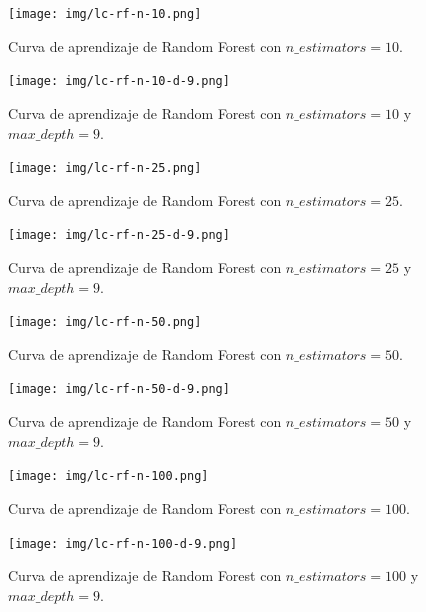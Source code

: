 \documentclass[11pt,a4paper]{article}
\begin{document}
\begin{figure}[H]
\centering
\begin{minipage}{.5\textwidth}
    \centering
    \texttt{[image: img/lc-rf-n-10.png]}
    \caption{Curva de aprendizaje de Random Forest con $n\_estimators=10$.}
    \label{fig:lc-rf-n-10}
\end{minipage}%
\begin{minipage}{.5\textwidth}
    \centering
    \texttt{[image: img/lc-rf-n-10-d-9.png]}
    \caption{Curva de aprendizaje de Random Forest con $n\_estimators=10$ y $max\_depth=9$.}
    \label{fig:lc-rf-n-10-d-9}
\end{minipage}
\end{figure}

\begin{figure}[H]
\centering
\begin{minipage}{.5\textwidth}
    \centering
    \texttt{[image: img/lc-rf-n-25.png]}
    \caption{Curva de aprendizaje de Random Forest con $n\_estimators=25$.}
    \label{fig:lc-rf-n-25}
\end{minipage}%
\begin{minipage}{.5\textwidth}
    \centering
    \texttt{[image: img/lc-rf-n-25-d-9.png]}
    \caption{Curva de aprendizaje de Random Forest con $n\_estimators=25$ y $max\_depth=9$.}
    \label{fig:lc-rf-n-25-d-9}
\end{minipage}
\end{figure}

\begin{figure}[H]
\centering
\begin{minipage}{.5\textwidth}
    \centering
    \texttt{[image: img/lc-rf-n-50.png]}
    \caption{Curva de aprendizaje de Random Forest con $n\_estimators=50$.}
    \label{fig:lc-rf-n-50}
\end{minipage}%
\begin{minipage}{.5\textwidth}
    \centering
    \texttt{[image: img/lc-rf-n-50-d-9.png]}
    \caption{Curva de aprendizaje de Random Forest con $n\_estimators=50$ y $max\_depth=9$.}
    \label{fig:lc-rf-n-50-d-9}
\end{minipage}
\end{figure}

\begin{figure}[H]
\centering
\begin{minipage}{.5\textwidth}
    \centering
    \texttt{[image: img/lc-rf-n-100.png]}
    \caption{Curva de aprendizaje de Random Forest con $n\_estimators=100$.}
    \label{fig:lc-rf-n-100}
\end{minipage}%
\begin{minipage}{.5\textwidth}
    \centering
    \texttt{[image: img/lc-rf-n-100-d-9.png]}
    \caption{Curva de aprendizaje de Random Forest con $n\_estimators=100$ y $max\_depth=9$.}
    \label{fig:lc-rf-n-100-d-9}
\end{minipage}
\end{figure}
\end{document}

